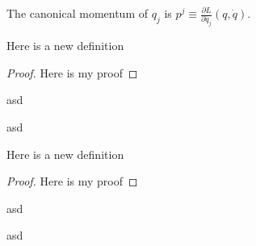 \begin{definition}
The canonical momentum of $q_j$ is $p^j\equiv\frac{\partial L}{\partial\dot{q_j}}(q,\dot{q})$\quad.\\
\end{definition}
\begin{theorem}
Here is a new definition
\begin{proof}
Here is my proof
\end{proof}
\begin{example}
asd
\end{example}
\begin{example}
asd
\end{example}
\end{theorem}
\begin{theorem}
Here is a new definition
\begin{proof}
Here is my proof
\end{proof}
\begin{example}
asd
\end{example}
\begin{example}
asd
\end{example}
\end{theorem}